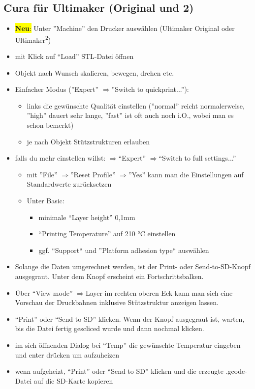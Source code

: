 \documentclass{\basedir/fablab-document}
\newcommand{\ts}[1]{\textsuperscript{#1}}
\newcommand{\ra}{$\Rightarrow$}
\begin{document}
\subsection{Cura für Ultimaker (Original und 2)}
\begin{itemize}
    \item \colorbox{yellow}{\textbf{Neu}:} Unter ''Machine'' den Drucker auswählen (Ultimaker Original oder Ultimaker\ts2)
\item mit Klick auf ``Load'' STL-Datei öffnen
\item Objekt nach Wunsch skalieren, bewegen, drehen etc.
\item Einfacher Modus (''Expert'' \ra ''Switch to quickprint...''):
  \begin{itemize}
    \item links die gewünschte Qualität einstellen (''normal'' reicht normalerweise, ''high'' dauert sehr lange, ''fast'' ist oft auch noch i.O., wobei man es schon bemerkt)
    \item je nach Objekt Stützstrukturen erlauben
  \end{itemize}
\item falls du mehr einstellen willst: \ra ``Expert'' \ra ``Switch to full settings...''
 \begin{itemize}
  \item mit ''File'' \ra ''Reset Profile'' \ra ''Yes'' kann man die Einstellungen auf Standardwerte zurücksetzen
  \item Unter Basic:
  \begin{itemize}
    \item minimale ``Layer height'' 0,1mm
    \item ``Printing Temperature'' auf 210 °C einstellen
    \item ggf. ``Support`` und ''Platform adhesion type`` auswählen
   \end{itemize}
 \end{itemize}
\item Solange die Daten umgerechnet werden, ist der Print- oder Send-to-SD-Knopf ausgegraut. Unter dem Knopf erscheint ein Fortschrittsbalken.
\item Über \enquote{View mode} \ra Layer im rechten oberen Eck kann man sich eine Vorschau der Druckbahnen inklusive Stützstruktur anzeigen lassen.
\item ``Print'' oder ``Send to SD'' klicken. Wenn der Knopf ausgegraut ist, warten, bis die Datei fertig gescliced wurde und dann nochmal klicken.
\item im sich öffnenden Dialog bei ``Temp'' die gewünschte Temperatur eingeben und enter drücken um aufzuheizen
\item wenn aufgeheizt, ``Print'' oder ``Send to SD'' klicken und die erzeugte .gcode-Datei auf die SD-Karte kopieren
\end{itemize}
\end{document}
